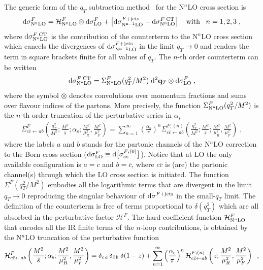 \documentclass[12pt]{article}
\def\beeq{\begin{eqnarray}}
\def\eeeq{\end{eqnarray}}
\DeclareRobustCommand{\as}{\ensuremath{\alpha_{\mathrm{s}}}}
\newcommand\f[2]{\frac{#1}{#2}}
\def\ito{\leftarrow}
\DeclareRobustCommand{\qt}{q_T}
\DeclareRobustCommand{\rd}{\ensuremath{\mathrm{d}}}
\begin{document}
The generic form of the $\qt$ subtraction method~\cite{Catani:2007vq} for the N$^{n}$LO cross section is
 \begin{equation}
 \label{masterEqqT}
 \rd\sigma^{F}_{\rm N^{n}LO} = \mathcal{H}^{F}_{\rm N^{n}LO} \otimes \rd\sigma^{F}_{\rm LO} + \big[ \rd\sigma^{F+{\rm jets}}_{\rm N^{n-1}LO} -  \rd\sigma^{F\;{\rm CT}}_{\rm N^{n}LO} \big]\;\;\;\;{\rm with}\;\;\; n=1,2,3\;,
 \end{equation}
where $\rd\sigma^{F\;{\rm CT}}_{\rm N^{n}LO}$ is the contribution of the counterterm to the N$^{n}$LO cross section which cancels the divergences of $\rd\sigma^{F+{\rm jets}}_{\rm N^{n-1}LO}$ in the limit $\qt \rightarrow 0$ and renders the term in square brackets finite for all values of $\qt$. 
The $n$-th order counterterm can be written
\begin{equation}
  \rd\sigma^{F\;{\rm CT}}_{\rm N^{n}LO} =   \Sigma^{F}_{\rm N^{n}LO}(\qt^{2}/M^{2})\;\rd^{2}\mathbf{q}_{T}   \otimes \rd\sigma^{F}_{\rm LO}\;,
\end{equation}
where the symbol $ \otimes$ denotes convolutions over momentum fractions and sums over flavour indices of the partons.
More precisely, the function $\Sigma^{F}_{\rm N^{n}LO}(\qt^{2}/M^{2})$ is the $n$-th order truncation of the perturbative series in $\as$
\beeq
\Sigma^{F}_{c\bar{c}\leftarrow ab}\left(\f{\qt^{2}}{M^{2}};\f{M^2}{\hat s};\as;
\f{M^2}{\mu_R^2},\f{M^2}{\mu_F^2}\right)=  \sum_{n=1}^\infty \left( \frac{\as}{\pi} \right)^n \Sigma^{F;(n)}_{c\bar{c}\leftarrow ab}\left(\f{\qt^{2}}{M^{2}};\f{M^2}{\hat s};
\f{M^2}{\mu_R^2},\f{M^2}{\mu_F^2}\right)\;,
\label{eq:sigexpansion}
\eeeq
where the labels $a$ and $b$ stands for the partonic channels of the N$^{n}$LO correction to the Born cross section ($\rd\sigma^{F}_{\rm LO}\equiv \rd\big[\sigma^{F;(0)}_{c\bar{c}}\big]$). Notice that at LO the only available configuration is $a=c$ and $b=\bar{c}$, where $c\bar{c}$ is (are) the partonic channel(s) through which the LO cross section is initiated.
The function $ \Sigma^{F}(\qt^{2}/M^{2})$ embodies all the logarithmic terms that are divergent in the limit $\qt \rightarrow 0$ reproducing the singular behaviour of  $\rd\sigma^{F+{\rm jets}}$ in the small-$\qt$ limit. The definition of the counterterm is free of terms proportional to $\delta(\qt^{2})$ which are all absorbed in the perturbative factor $\mathcal{H}^{F}$. The hard coefficient function $\mathcal{H}^{F}_{\rm N^{n}LO}$  that encodes all the IR finite terms of the $n$-loop contributions, is obtained by the N$^{n}$LO truncation of the perturbative function
\begin{equation}
\label{Hstexpand}
{\cal H}^F_{c\bar{c}\ito ab}\left(\f{M^2}{\hat s};\as;
\f{M^2}{\mu_R^2},\f{M^2}{\mu_F^2}\right)=\delta_{c\,a} \,\delta_{\bar{c}\,b}\;\delta(1-z)+
\sum_{n=1}^{\infty}\left(\frac{\as}{\pi}\right)^n 
{\cal H}^{F;(n)}_{c\bar{c}\ito ab}\left(z;
\f{M^2}{\mu_R^2},\f{M^2}{\mu_F^2}\right)\;\; ,
\end{equation}
\end{document}

